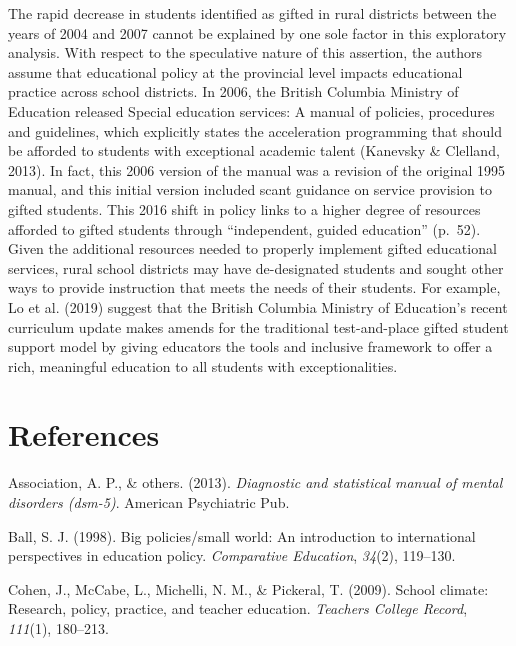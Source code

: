 \documentclass[
  english,
  man,floatsintext]{apa6}
\begin{document}
The rapid decrease in students identified as gifted in rural districts between the years of 2004 and 2007 cannot be explained by one sole factor in this exploratory analysis. With respect to the speculative nature of this assertion, the authors assume that educational policy at the provincial level impacts educational practice across school districts. In 2006, the British Columbia Ministry of Education released Special education services: A manual of policies, procedures and guidelines, which explicitly states the acceleration programming that should be afforded to students with exceptional academic talent (Kanevsky \& Clelland, 2013). In fact, this 2006 version of the manual was a revision of the original 1995 manual, and this initial version included scant guidance on service provision to gifted students. This 2016 shift in policy links to a higher degree of resources afforded to gifted students through \enquote{independent, guided education} (p.~52). Given the additional resources needed to properly implement gifted educational services, rural school districts may have de-designated students and sought other ways to provide instruction that meets the needs of their students. For example, Lo et al. (2019) suggest that the British Columbia Ministry of Education's recent curriculum update makes amends for the traditional test-and-place gifted student support model by giving educators the tools and inclusive framework to offer a rich, meaningful education to all students with exceptionalities.

\newpage

\hypertarget{references}{%
\section{References}\label{references}}

\begingroup
\setlength{\parindent}{-0.5in}
\setlength{\leftskip}{0.5in}

\hypertarget{refs}{}
\leavevmode\hypertarget{ref-american_2013}{}%
Association, A. P., \& others. (2013). \emph{Diagnostic and statistical manual of mental disorders (dsm-5)}. American Psychiatric Pub.

\leavevmode\hypertarget{ref-ball_1998}{}%
Ball, S. J. (1998). Big policies/small world: An introduction to international perspectives in education policy. \emph{Comparative Education}, \emph{34}(2), 119--130.

\leavevmode\hypertarget{ref-cohen_2009}{}%
Cohen, J., McCabe, L., Michelli, N. M., \& Pickeral, T. (2009). School climate: Research, policy, practice, and teacher education. \emph{Teachers College Record}, \emph{111}(1), 180--213.
\end{document}

